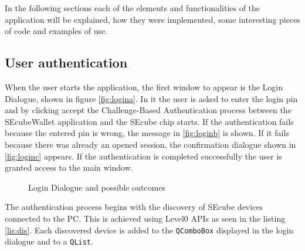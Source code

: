 In the following sections each of the elements and functionalities of the application will be explained, how they were implemented, some interesting pieces of code and examples of use.

\subsection{User authentication}

When the user starts the application, the first window to appear is the Login Dialogue, shown in figure \ref{fig:logina}. In it the user is asked to enter the login pin and by clicking accept the Challenge-Based Authentication process between the SEcubeWallet application and the SEcube chip starts. If the authentication fails because the entered pin is wrong, the message in \ref{fig:loginb} is shown. If it fails because there was already an opened session, the confirmation dialogue shown in \ref{fig:loginc} appears. If the authentication is completed successfully the user is granted access to the main window.

\begin{figure}[ht]
  \centering
  {}
  {}
  \caption{Login Dialogue and possible outcomes}
 \label{fig:login}
\end{figure}

The authentication process begins with the discovery of SEcube devices connected to the PC. This is achieved using Level0 APIs as seen in the listing \ref{lis:dis}. Each discovered device is added to the \texttt{QComboBox} displayed in the login dialogue and to a \texttt{QList}.

